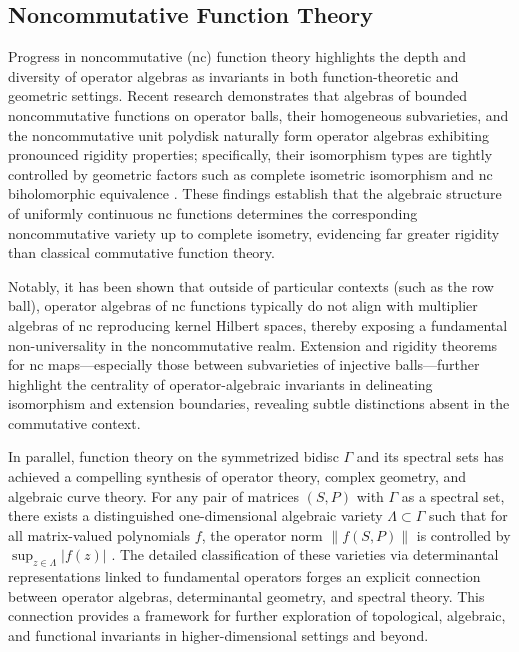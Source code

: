 \subsection{Noncommutative Function Theory}

Progress in noncommutative (nc) function theory highlights the depth and diversity of operator algebras as invariants in both function-theoretic and geometric settings. Recent research demonstrates that algebras of bounded noncommutative functions on operator balls, their homogeneous subvarieties, and the noncommutative unit polydisk naturally form operator algebras exhibiting pronounced rigidity properties; specifically, their isomorphism types are tightly controlled by geometric factors such as complete isometric isomorphism and nc biholomorphic equivalence \cite{ref98}. These findings establish that the algebraic structure of uniformly continuous nc functions determines the corresponding noncommutative variety up to complete isometry, evidencing far greater rigidity than classical commutative function theory.

Notably, it has been shown that outside of particular contexts (such as the row ball), operator algebras of nc functions typically do not align with multiplier algebras of nc reproducing kernel Hilbert spaces, thereby exposing a fundamental non-universality in the noncommutative realm. Extension and rigidity theorems for nc maps---especially those between subvarieties of injective balls---further highlight the centrality of operator-algebraic invariants in delineating isomorphism and extension boundaries, revealing subtle distinctions absent in the commutative context.

In parallel, function theory on the symmetrized bidisc $\Gamma$ and its spectral sets has achieved a compelling synthesis of operator theory, complex geometry, and algebraic curve theory. For any pair of matrices $(S, P)$ with $\Gamma$ as a spectral set, there exists a distinguished one-dimensional algebraic variety $\Lambda \subset \Gamma$ such that for all matrix-valued polynomials $f$, the operator norm $\|f(S,P)\|$ is controlled by $\sup_{z \in \Lambda} |f(z)|$ \cite{ref99}. The detailed classification of these varieties via determinantal representations linked to fundamental operators forges an explicit connection between operator algebras, determinantal geometry, and spectral theory. This connection provides a framework for further exploration of topological, algebraic, and functional invariants in higher-dimensional settings and beyond.

